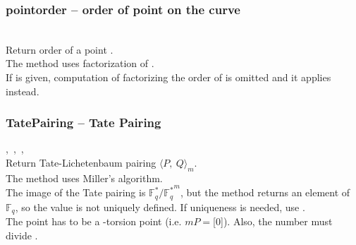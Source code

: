   \subsubsection{pointorder -- order of point on the curve}
   \\
   \spacing
   \quad Return order of a point . \\
   \spacing
   \quad \negok The method uses factorization of .\\
   If  is given, computation of factorizing the order of  is omitted and it applies  instead.\\
   \spacing
%
  \subsubsection{TatePairing -- Tate Pairing}
        {,\ 
          ,\ 
          ,\ 
        }
        {}\\
   \spacing
   \quad Return Tate-Lichetenbaum pairing ${\langle P,\ Q\rangle}_m$.\\
   \spacing
   \quad \negok The method uses Miller's algorithm.\\
   The image of the Tate pairing is $\mathbb{F}_q^*/{\mathbb{F}_q^*}^m$, but the method returns an element of $\mathbb{F}_q$, so the value is not uniquely defined.
   If uniqueness is needed, use .\\
   \spacing
   \quad The point \param{P} has to be a -torsion point (i.e. $mP=$[0]).
   Also, the number \param{m} must divide .\\
%
